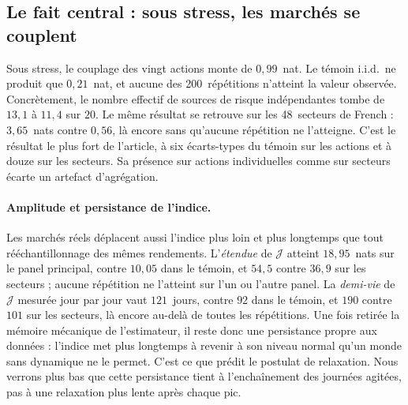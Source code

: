 \documentclass[11pt]{article}
\theoremstyle{definition}
\newcommand{\JJ}{\mathcal{J}}
\begin{document}
\subsection{Le fait central : sous stress, les marchés se couplent}

Sous stress, le couplage des vingt actions monte de $0{,}99$~nat. Le témoin
i.i.d.\ ne produit que $0{,}21$~nat, et aucune des 200~répétitions n'atteint la
valeur observée. Concrètement, le nombre effectif de sources de risque
indépendantes tombe de $13{,}1$ à $11{,}4$ sur $20$. Le même résultat se
retrouve sur les 48~secteurs de French : $3{,}65$~nats contre $0{,}56$, là
encore sans qu'aucune répétition ne l'atteigne. C'est le résultat le plus
fort de l'article, à six écarts-types du témoin sur les actions et à douze
sur les secteurs. Sa présence sur actions individuelles comme sur secteurs
écarte un artefact d'agrégation.

\paragraph{Amplitude et persistance de l'indice.} Les marchés réels déplacent
aussi l'indice plus loin et plus longtemps que tout rééchantillonnage des
mêmes rendements. L'\emph{étendue} de $\JJ$ atteint $18{,}95$~nats sur le panel
principal, contre $10{,}05$ dans le témoin, et $54{,}5$ contre $36{,}9$ sur les
secteurs ; aucune répétition ne l'atteint sur l'un ou l'autre panel. La
\emph{demi-vie} de $\JJ$ mesurée jour par jour vaut $121$~jours, contre $92$
dans le témoin, et $190$ contre $101$ sur les secteurs, là encore au-delà de
toutes les répétitions. Une fois retirée la mémoire mécanique de l'estimateur,
il reste donc une persistance propre aux données : l'indice met plus longtemps
à revenir à son niveau normal qu'un monde sans dynamique ne le permet. C'est
ce que prédit le postulat de relaxation. Nous verrons plus bas que cette
persistance tient à l'enchaînement des journées agitées, pas à une
relaxation plus lente après chaque pic.
\end{document}
